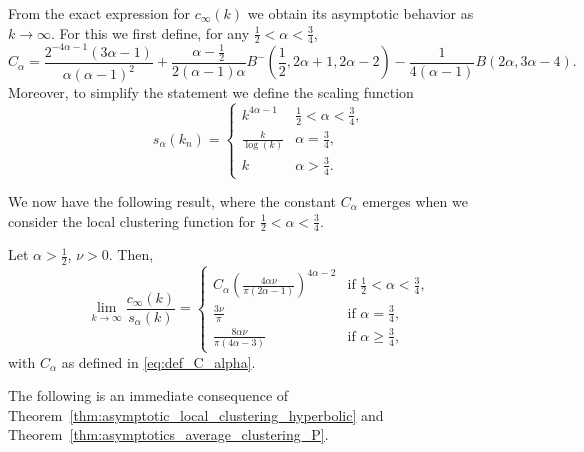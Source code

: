 From the exact expression for $c_\infty(k)$ we obtain its asymptotic behavior as $k \to \infty$. For this we first define, for any $\frac{1}{2} < \alpha < \frac{3}{4}$,
\begin{equation}\label{eq:def_C_alpha}
	C_\alpha = \frac{2^{-4\alpha - 1}(3\alpha - 1)}{\alpha(\alpha-1)^2} 
	+ \frac{\alpha - \frac{1}{2}}{2(\alpha - 1)\alpha} B^-(\frac{1}{2},2\alpha + 1, 2\alpha - 2)
	- \frac{1}{4(\alpha - 1)}B(2\alpha, 3\alpha - 4).
\end{equation}
Moreover, to simplify the statement we define the scaling function 
\begin{equation}\label{eq:def_scaling_function}
s_\alpha(k_n) = \begin{cases} 
		k^{4\alpha-1} &\frac{1}{2}<\alpha<\frac{3}{4}, \\
		\frac{k}{\log(k)} & \alpha = \frac{3}{4}, \\
		k &\alpha > \frac{3}{4}.
\end{cases}
\end{equation}

We now have the following result, where the constant $C_\alpha$ emerges when we consider the local clustering function for $\frac{1}{2} < \alpha < \frac{3}{4}$.

\begin{theorem}\label{thm:asymptotics_average_clustering_P}
Let $\alpha > \frac{1}{2}$, $\nu > 0$. Then,
\[
	\lim_{k \to \infty} \frac{c_\infty(k)}{s_\alpha(k)} 
	= \begin{cases}
			C_\alpha \left(\frac{4\alpha \nu}{\pi\left(2\alpha - 1\right)}\right)^{4\alpha - 2}
			&\mbox{if } \frac{1}{2} < \alpha < \frac{3}{4},\\
			\frac{3 \nu}{\pi} &\mbox{if } \alpha = \frac{3}{4},\\
			\frac{8\alpha \nu}{\pi\left(4\alpha - 3\right)} &\mbox{if } \alpha \ge \frac{3}{4},
	\end{cases}
\]
with $C_\alpha$ as defined in \eqref{eq:def_C_alpha}.
\end{theorem}

The following is an immediate consequence of Theorem~\ref{thm:asymptotic_local_clustering_hyperbolic} and Theorem~\ref{thm:asymptotics_average_clustering_P}.

